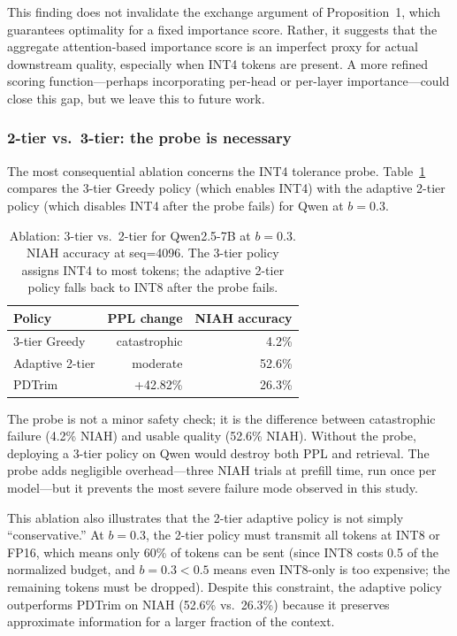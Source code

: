 \documentclass[11pt]{article}
\newcommand{\budget}{b}
\newcommand{\pct}{\%}
\theoremstyle{plain}
\theoremstyle{definition}
\begin{document}
This finding does not invalidate the exchange argument of Proposition~1, which guarantees optimality for a fixed importance score.  Rather, it suggests that the aggregate attention-based importance score is an imperfect proxy for actual downstream quality, especially when INT4 tokens are present.  A more refined scoring function---perhaps incorporating per-head or per-layer importance---could close this gap, but we leave this to future work.

\subsubsection{2-tier vs.\ 3-tier: the probe is necessary}
\label{sec:ablation-probe}

The most consequential ablation concerns the INT4 tolerance probe.  Table~\ref{tab:ablation-probe} compares the 3-tier Greedy policy (which enables INT4) with the adaptive 2-tier policy (which disables INT4 after the probe fails) for Qwen at $\budget=0.3$.

\begin{table}[t]
\centering
\caption{Ablation: 3-tier vs.\ 2-tier for Qwen2.5-7B at $\budget=0.3$.  NIAH accuracy at seq=4096.  The 3-tier policy assigns INT4 to most tokens; the adaptive 2-tier policy falls back to INT8 after the probe fails.}
\label{tab:ablation-probe}
\small
\begin{tabular}{lrr}
\toprule
Policy & PPL change & NIAH accuracy \\
\midrule
3-tier Greedy & catastrophic & 4.2\pct{} \\
Adaptive 2-tier & moderate & 52.6\pct{} \\
PDTrim & +42.82\pct{} & 26.3\pct{} \\
\bottomrule
\end{tabular}
\end{table}

The probe is not a minor safety check; it is the difference between catastrophic failure (4.2\pct{} NIAH) and usable quality (52.6\pct{} NIAH).  Without the probe, deploying a 3-tier policy on Qwen would destroy both PPL and retrieval.  The probe adds negligible overhead---three NIAH trials at prefill time, run once per model---but it prevents the most severe failure mode observed in this study.

This ablation also illustrates that the 2-tier adaptive policy is not simply ``conservative.''  At $\budget=0.3$, the 2-tier policy must transmit all tokens at INT8 or FP16, which means only 60\pct{} of tokens can be sent (since INT8 costs 0.5 of the normalized budget, and $\budget=0.3 < 0.5$ means even INT8-only is too expensive; the remaining tokens must be dropped).  Despite this constraint, the adaptive policy outperforms PDTrim on NIAH (52.6\pct{} vs.\ 26.3\pct{}) because it preserves approximate information for a larger fraction of the context.
\end{document}
